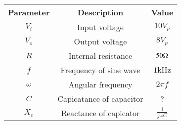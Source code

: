  \begin{tabular}{|c|c|c|}
        \hline
        \textbf{Parameter} & \textbf{Description} & \textbf{Value} \\
        \hline
        $V_i$ & Input voltage & $10V_p$  \\ \hline
        $V_o$ & Output voltage & $8V_p$ \\ \hline
        $R$ &Internal resistance & $50 \ohm$ \\ \hline
        $f$ &Frequency of sine wave & $1\text{kHz}$ \\ \hline
        $\omega$ &Angular frequency & $2\pi f$ \\ \hline
        $C$ & Capicatance of capacitor & ? \\ \hline
        $X_c$ & Reactance of capicator & $\frac{1}{j\omega C}$ \\ \hline
        
    \end{tabular}

